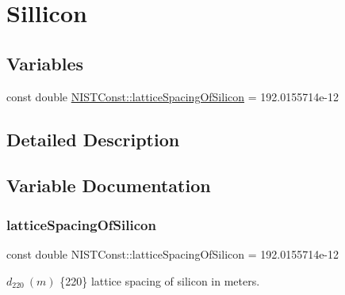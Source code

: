 \hypertarget{group___sillicon}{}\section{Sillicon}
\label{group___sillicon}
\subsection*{Variables}
\begin{DoxyCompactItemize}
\item 
const double \hyperlink{group___sillicon_ga439c53134da8a910d17c996b136da7a8}{N\+I\+S\+T\+Const\+::lattice\+Spacing\+Of\+Silicon} = 192.\+0155714e-\/12
\end{DoxyCompactItemize}


\subsection{Detailed Description}


\subsection{Variable Documentation}
\mbox{\label{group___sillicon_ga439c53134da8a910d17c996b136da7a8}} 
\subsubsection{\texorpdfstring{lattice\+Spacing\+Of\+Silicon}{latticeSpacingOfSilicon}}
{\footnotesize\ttfamily const double N\+I\+S\+T\+Const\+::lattice\+Spacing\+Of\+Silicon = 192.\+0155714e-\/12}

$d_{220} \ (m)$ \{220\} lattice spacing of silicon in meters. 